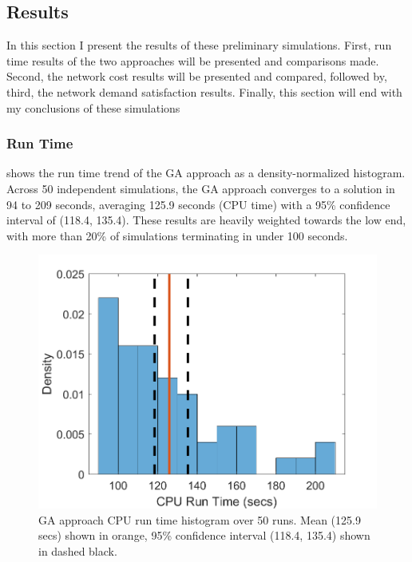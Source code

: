 \documentclass[12pt,dvipsnames]{report}
\begin{document}
\subsection{Results} \label{subsec:prelim_results}

In this section I present the results of these preliminary simulations.  First, run time results of the two approaches will be presented and comparisons made.  Second, the network cost results will be presented and compared, followed by, third, the network demand satisfaction results.  Finally, this section will end with my conclusions of these simulations

\subsubsection{Run Time}

 shows the run time trend of the GA approach as a density-normalized histogram.  Across 50 independent simulations, the GA approach converges to a solution in 94 to 209 seconds, averaging 125.9 seconds (CPU time) with a 95\% confidence interval of (118.4, 135.4).  These results are heavily weighted towards the low end, with more than 20\% of simulations terminating in under 100 seconds.

\begin{figure}[htp]
	\centering
	\includegraphics[height=0.4\textheight]{Figures/Prelim_GARuntime50}
	\caption[Preliminary simulations GA CPU run time histogram]{GA approach CPU run time histogram over 50 runs.  Mean (125.9 secs) shown in orange, 95\% confidence interval (118.4, 135.4) shown in dashed black.}
	\label{fig:Prelim_GARunTime}
\end{figure}
\end{document}
